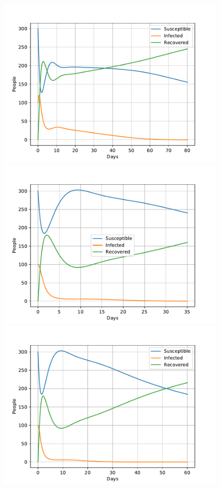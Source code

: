 \documentclass[a4paper]{article}
\begin{document}
\begin{figure}[!htb]
	\includegraphics[scale=0.56]{../plots/opp_e_B2.pdf}	
	\includegraphics[scale=0.56]{../plots/opp_e_C1.pdf}
	\includegraphics[scale=0.56]{../plots/opp_e_C2.pdf}

\end{figure}
\end{document}
